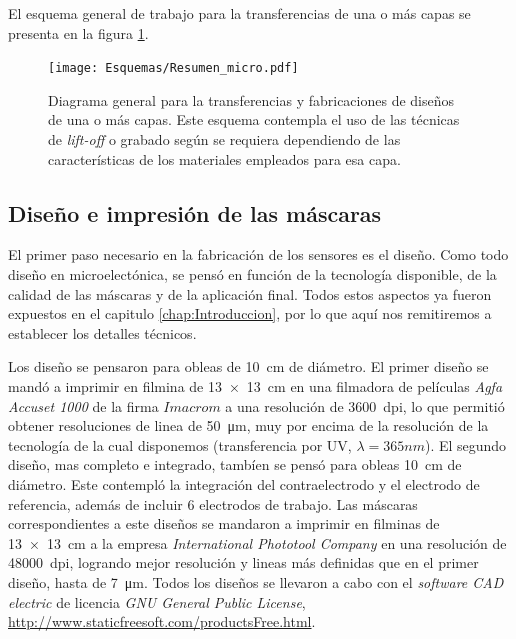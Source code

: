 	El esquema general de trabajo para la transferencias de una o más capas se presenta en la figura \ref{esq:micro}.

			\begin{figure}[ht]
			  \begin{center}
			  \texttt{[image: Esquemas/Resumen\_micro.pdf]}
			  \caption[Esquema para la transferencia de diseños]{Diagrama general para la transferencias y fabricaciones de diseños de una o más capas. Este esquema contempla el uso de las técnicas de \textit{lift-off }o grabado según se requiera dependiendo de las características de los materiales empleados para esa capa.}
			  \label{esq:micro}
			  \end{center}
			  \end{figure}
			  
	\subsection{Diseño e impresión de las máscaras}\label{sec:impresion_mascaras}

		El primer paso necesario en la fabricación de los sensores es el diseño. Como todo diseño en microelectónica, se pensó en función de la tecnología disponible, de la calidad de las máscaras y de la aplicación final. Todos estos aspectos ya fueron expuestos en el capitulo \ref{chap:Introduccion}, por lo que aquí nos remitiremos a establecer los detalles técnicos.

		Los diseño se pensaron para obleas de \SI{10}{\cm} de diámetro. El primer diseño se mandó a imprimir en filmina de \SI{13x13}{\cm} en una filmadora de películas \textit{Agfa Accuset 1000} de la firma $Imacrom$ a una resolución de \SI{3600}{dpi}, lo que permitió obtener resoluciones de linea de \SI{50}{\um}, muy por encima de la resolución de la tecnología de la cual disponemos (transferencia por UV, $\lambda=365nm$). El segundo diseño, mas completo e integrado, tambíen se pensó para obleas \SI{10}{\cm} de diámetro. Este contempló la integración del contraelectrodo y el electrodo de referencia, además de incluir 6 electrodos de trabajo. Las máscaras correspondientes a este diseños se mandaron a imprimir en filminas de \SI{13x13}{\cm} a la empresa \textit{International Phototool Company} en una resolución de \SI{48000}{dpi}, logrando mejor resolución y lineas más definidas que en el primer diseño, hasta de \SI{7}{\um}. Todos los diseños se llevaron a cabo con el \textit{software CAD electric} de licencia \textit{GNU General Public License}, \url{http://www.staticfreesoft.com/productsFree.html}.
				
